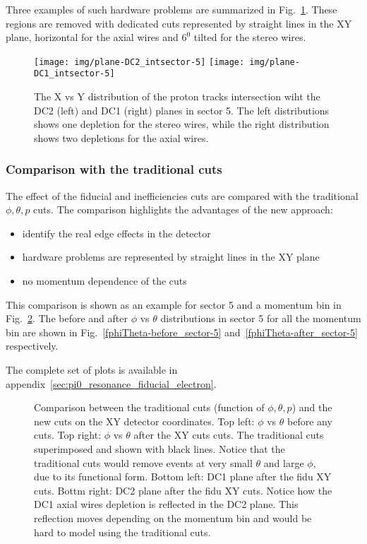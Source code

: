 Three examples of such hardware problems are summarized in Fig.~\ref{fig:xy_dc12_s5}.
These regions are removed with dedicated cuts represented by straight lines in the XY plane,
horizontal for the axial wires and $6^0$ tilted for the stereo wires.


\begin{figure}[ht]
    \centering
    \texttt{[image: img/plane-DC2\_intsector-5]}
    \texttt{[image: img/plane-DC1\_intsector-5]}
    \caption{The X vs Y distribution of the proton tracks intersection wiht the DC2 (left)
        and DC1 (right) planes in sector 5. The left distributions shows one depletion for the stereo wires,
        while the right distribution shows two depletions for the axial wires.}
    \label{fig:xy_dc12_s5}
\end{figure}

\subsubsection{Comparison with the traditional cuts}

The effect of the fiducial and inefficiencies cuts are compared with the traditional $\phi, \theta, p$ cuts.
The comparison highlights the advantages of the new approach:

\begin{itemize}
    \item identify the real edge effects in the detector
    \item hardware problems are represented by straight lines in the XY plane
    \item no momentum dependence of the cuts
\end{itemize}
This comparison is shown as an example for sector 5 and a momentum bin in Fig.~\ref{fig:PnPvsTmom-3.8_sector-5_plot-phiVsTheta}.
The before and after $\phi$ vs $\theta$ distributions in sector 5 for all the momentum bin are shown in Fig.~\ref{fphiTheta-before_sector-5}
and~\ref{fphiTheta-after_sector-5} respectively.

The complete set of plots is available in appendix~\ref{sec:pi0_resonance_fiducial_electron}.

\begin{figure}[ht]
    \centering
    \caption{Comparison between the traditional cuts (function of $\phi, \theta, p$) and the new cuts on the XY detector coordinates.
    Top left:  $\phi$ vs $\theta$ before any cuts. Top right:  $\phi$ vs $\theta$ after the XY cuts cuts. The traditional cuts superimposed
    and shown with black lines. Notice that the traditional cuts would remove events at very small $\theta$ and large $\phi$, due to its functional form.
    Bottom left: DC1 plane after the fidu XY cuts. Bottm right: DC2 plane after the fidu XY cuts.
    Notice how the DC1 axial wires depletion is reflected in the DC2 plane. This reflection moves depending on the momentum bin and would be hard to model
    using the traditional cuts.}
    \label{fig:PnPvsTmom-3.8_sector-5_plot-phiVsTheta}
\end{figure}




